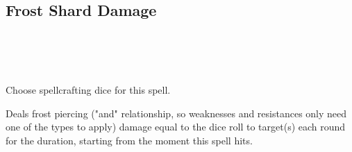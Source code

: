 \subsection*{Frost Shard Damage}
 \\
\\
\\

Choose spellcrafting dice for this spell.

Deals frost piercing ("and" relationship, so weaknesses and resistances
only need one of the types to apply) damage equal to the dice roll to
target(s) each round for the duration, starting from the moment this
spell hits.
